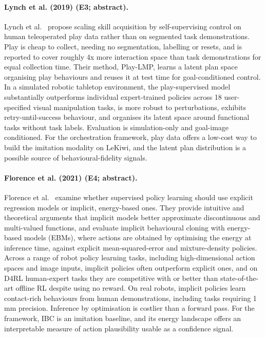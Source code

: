 \documentclass[10pt,a4paper]{article}
\begin{document}
\paragraph{Lynch et al. (2019) (E3; abstract).} Lynch et al.~\cite{Lynch2019} propose scaling skill acquisition by self-supervising control on human teleoperated play data rather than on segmented task demonstrations. Play is cheap to collect, needing no segmentation, labelling or resets, and is reported to cover roughly 4x more interaction space than task demonstrations for equal collection time. Their method, Play-LMP, learns a latent plan space organising play behaviours and reuses it at test time for goal-conditioned control. In a simulated robotic tabletop environment, the play-supervised model substantially outperforms individual expert-trained policies across 18 user-specified visual manipulation tasks, is more robust to perturbations, exhibits retry-until-success behaviour, and organises its latent space around functional tasks without task labels. Evaluation is simulation-only and goal-image conditioned. For the orchestration framework, play data offers a low-cost way to build the imitation modality on LeKiwi, and the latent plan distribution is a possible source of behavioural-fidelity signals.

\paragraph{Florence et al. (2021) (E4; abstract).} Florence et al.~\cite{Florence2021} examine whether supervised policy learning should use explicit regression models or implicit, energy-based ones. They provide intuitive and theoretical arguments that implicit models better approximate discontinuous and multi-valued functions, and evaluate implicit behavioural cloning with energy-based models (EBMs), where actions are obtained by optimising the energy at inference time, against explicit mean-squared-error and mixture-density policies. Across a range of robot policy learning tasks, including high-dimensional action spaces and image inputs, implicit policies often outperform explicit ones, and on D4RL human-expert tasks they are competitive with or better than state-of-the-art offline RL despite using no reward. On real robots, implicit policies learn contact-rich behaviours from human demonstrations, including tasks requiring 1 mm precision. Inference by optimisation is costlier than a forward pass. For the framework, IBC is an imitation baseline, and its energy landscape offers an interpretable measure of action plausibility usable as a confidence signal.
\end{document}
